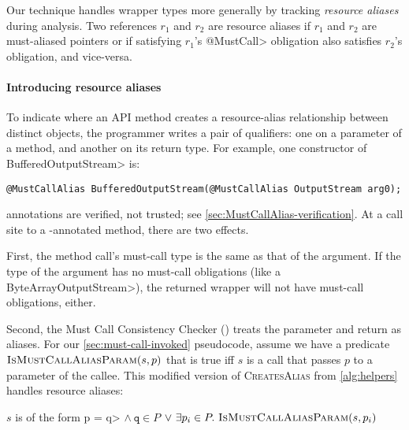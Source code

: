 Our technique handles wrapper types more generally by tracking \emph{resource
aliases} during analysis.  Two references $r_1$ and $r_2$ are resource aliases
if $r_1$ and $r_2$ are must-aliased pointers or if
satisfying $r_1$'s \<@MustCall> obligation also satisfies $r_2$'s
  obligation, and vice-versa.

\paragraph{Introducing resource aliases}
To indicate where an API method creates a resource-alias
relationship between distinct objects, the programmer writes a pair of 
\MustCallAlias qualifiers:  one on a parameter
of a method, and another on its return type.
For example, one constructor of \<BufferedOutputStream> is:
\begin{lstlisting}
@MustCallAlias BufferedOutputStream(@MustCallAlias OutputStream arg0);
\end{lstlisting}

\noindent
\MustCallAlias annotations are verified, not trusted; see \cref{sec:MustCallAlias-verification}.
At a call site to a \MustCallAlias-annotated method, there are two effects.

First, the method call's must-call type is the same as that of the
argument.  If the type of the argument has no must-call obligations (like a
\<ByteArrayOutputStream>), the returned wrapper will not have must-call
obligations, either.

Second,
the Must Call Consistency Checker
() treats the \MustCallAlias parameter and return as
aliases.  For our \cref{sec:must-call-invoked} pseudocode, assume we have a
predicate $\textsc{IsMust\-CallAliasParam}(s,p)$ that is true iff $s$ is a call that
passes $p$ to a \MustCallAlias parameter of the callee.
This modified
version of \textsc{CreatesAlias} from \cref{alg:helpers} handles resource aliases:
\begin{algorithmic}
    \State \Return $s$ is of the form \<p = q> $\wedge\ \mathtt{q} \in P$ \newline
         \hspace*{4.5em} $\vee\ \exists p_i \in P.\ \textsc{IsMustCallAliasParam}(s,p_i)$ 
    \EndProcedure
\end{algorithmic}


